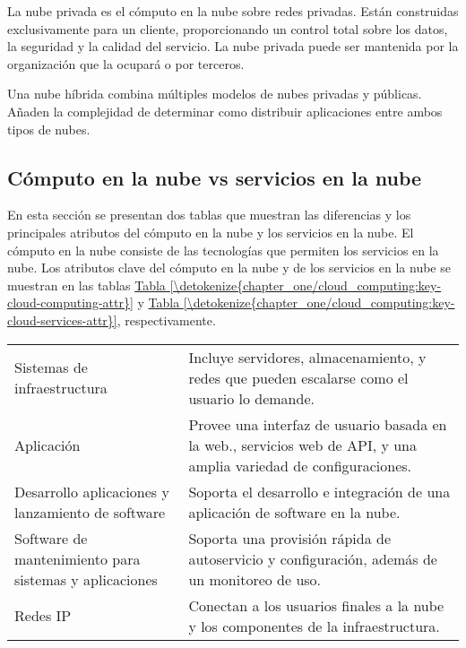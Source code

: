 La nube privada es el cómputo en la nube sobre redes privadas. Están construidas
exclusivamente para un cliente, proporcionando un control total sobre los datos,
la seguridad y la calidad del servicio. La nube privada puede ser mantenida por
la organización que la ocupará o por terceros.

Una nube híbrida combina múltiples modelos de nubes privadas y públicas. Añaden
la complejidad de determinar como distribuir aplicaciones entre ambos tipos de nubes.


\subsection{Cómputo en la nube vs servicios en la nube}
\label{\detokenize{chapter_one/cloud_computing:computo-en-la-nube-vs-servicios-en-la-nube}}
En esta sección se presentan dos tablas que muestran las diferencias y los principales
atributos del cómputo en la nube y los servicios en la nube. El cómputo en la nube
consiste de las tecnologías que permiten los servicios en la nube. Los atributos
clave del cómputo en la nube y de los servicios en la nube se muestran en las
tablas \hyperref[\detokenize{chapter_one/cloud_computing:key-cloud-computing-attr}]{Tabla \ref{\detokenize{chapter_one/cloud_computing:key-cloud-computing-attr}}} y \hyperref[\detokenize{chapter_one/cloud_computing:key-cloud-services-attr}]{Tabla \ref{\detokenize{chapter_one/cloud_computing:key-cloud-services-attr}}}, respectivamente.


\begin{savenotes}\sphinxattablestart
\centering
{}
\label{\detokenize{chapter_one/cloud_computing:key-cloud-computing-attr}}
\sphinxaftercaption
\begin{tabulary}{\linewidth}[t]{|T|T|}
\hline
{}\relax &\relax \\
\hline
Sistemas de infraestructura
&
Incluye servidores, almacenamiento, y redes que pueden escalarse como el usuario lo demande.
\\
\hline
Aplicación
&
Provee una interfaz de usuario basada en la web., servicios web de API, y una amplia variedad de configuraciones.
\\
\hline
Desarrollo aplicaciones y lanzamiento de software
&
Soporta el desarrollo e integración de una aplicación de software en la nube.
\\
\hline
Software de mantenimiento para sistemas y aplicaciones
&
Soporta una provisión rápida de autoservicio y configuración, además de un monitoreo de uso.
\\
\hline
Redes IP
&
Conectan a los usuarios finales a la nube y los componentes de la infraestructura.
\\
\hline
\end{tabulary}
\par
\sphinxattableend\end{savenotes}


